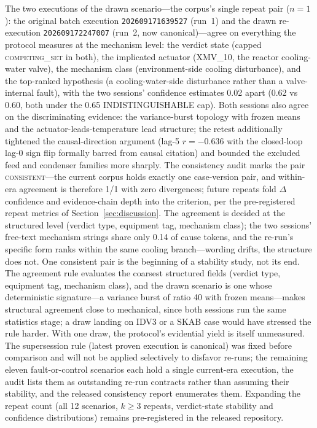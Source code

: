 \documentclass[preprint,10pt]{elsarticle}
\begin{document}
The two executions of the drawn scenario---the corpus's single repeat pair ($n{=}1$): the original batch execution \texttt{202609171639527} (run~1) and the drawn re-execution \texttt{202609172247007} (run~2, now canonical)---agree on everything the protocol measures at the mechanism level: the verdict state (capped \mbox{\textsc{competing\_set}} in both), the implicated actuator (XMV\_10, the reactor cooling-water valve), the mechanism class (environment-side cooling disturbance), and the top-ranked hypothesis (a cooling-water-side disturbance rather than a valve-internal fault), with the two sessions' confidence estimates 0.02 apart (0.62 vs 0.60, both under the 0.65 INDISTINGUISHABLE cap). Both sessions also agree on the discriminating evidence: the variance-burst topology with frozen means and the actuator-leads-temperature lead structure; the retest additionally tightened the causal-direction argument (lag-5 $r{=}{-}0.636$ with the closed-loop lag-0 sign flip formally barred from causal citation) and bounded the excluded feed and condenser families more sharply. The consistency audit marks the pair \textsc{consistent}---the current corpus holds exactly one case-version pair, and within-era agreement is therefore 1/1 with zero divergences; future repeats fold $\Delta$confidence and evidence-chain depth into the criterion, per the pre-registered repeat metrics of Section~\ref{sec:discussion}. The agreement is decided at the structured level (verdict type, equipment tag, mechanism class); the two sessions' free-text mechanism strings share only 0.14 of cause tokens, and the re-run's specific form ranks within the same cooling branch---wording drifts, the structure does not. One consistent pair is the beginning of a stability study, not its end. The agreement rule evaluates the coarsest structured fields (verdict type, equipment tag, mechanism class), and the drawn scenario is one whose deterministic signature---a variance burst of ratio 40 with frozen means---makes structural agreement close to mechanical, since both sessions run the same statistics stage; a draw landing on IDV3 or a SKAB case would have stressed the rule harder. With one draw, the protocol's evidential yield is itself unmeasured. The supersession rule (latest proven execution is canonical) was fixed before comparison and will not be applied selectively to disfavor re-runs; the remaining eleven fault-or-control scenarios each hold a single current-era execution, the audit lists them as outstanding re-run contracts rather than assuming their stability, and the released consistency report enumerates them. Expanding the repeat count (all 12 scenarios, $k \ge 3$ repeats, verdict-state stability and confidence distributions) remains pre-registered in the released repository.
\end{document}

